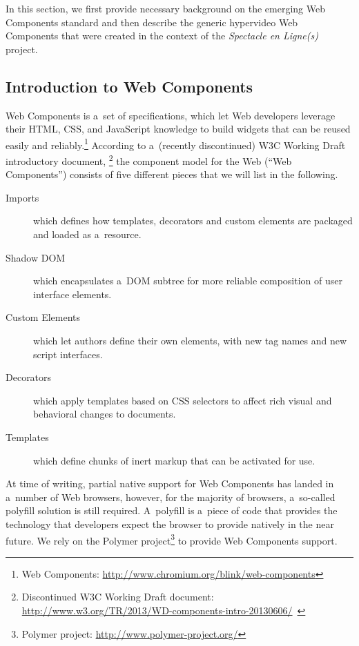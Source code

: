 \documentclass[runningheads,a4paper]{llncs}
\begin{document}
In this section, we first provide necessary background on the emerging Web Components standard
and then describe the generic hypervideo Web Components
that were created in the context of the \emph{Spectacle en Ligne(s)} project.

\subsection{Introduction to Web Components}

Web Components is a~set of specifications, which let Web developers leverage
their HTML, CSS, and JavaScript knowledge to build widgets
that can be reused easily and reliably.\footnote{Web Components:
\url{http://www.chromium.org/blink/web-components}}
According to a~(recently discontinued) W3C Working Draft introductory document,%
\footnote{Discontinued W3C Working Draft document:
\url{http://www.w3.org/TR/2013/WD-components-intro-20130606/}~\cite{cooney2013webcomponents}}
the component model for the Web (``Web Components'') consists of five different pieces
that we will list in the following.

\begin{description}
  \item[Imports] which defines how templates, decorators and custom elements are packaged and loaded as a~resource.
  \item[Shadow DOM] which encapsulates a~DOM subtree for more reliable composition of user interface elements.    
  \item[Custom Elements] which let authors define their own elements, with new tag names and new script interfaces.  
  \item[Decorators] which apply templates based on CSS selectors to affect rich visual and behavioral changes to documents.
  \item[Templates] which define chunks of inert markup that can be activated for use.  
\end{description}

\noindent At time of writing, partial native support for Web Components
has landed in a~number of Web browsers,
however, for the majority of browsers,
a~so-called polyfill solution is still required.
A~polyfill  is a~piece of code that provides the technology
that developers expect the browser to provide natively in the near future.
We rely on the Polymer project\footnote{Polymer project:
\url{http://www.polymer-project.org/}}
to provide Web Components support. %
\end{document}
